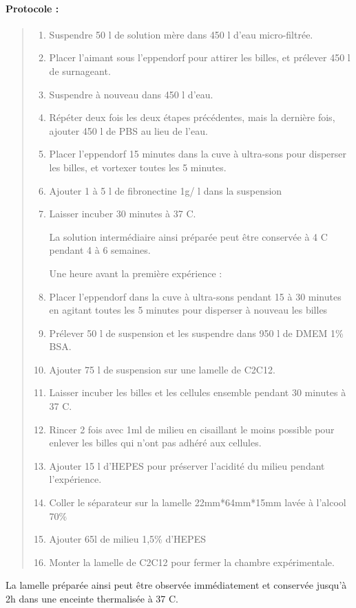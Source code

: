 	\paragraph{Protocole : }
	\begin{quote}
	\begin{enumerate}
	\item Suspendre 50 \micro l de solution mère dans 450  \micro l d'eau micro-filtrée. 
	\item Placer l'aimant sous l'eppendorf pour attirer les billes, et prélever 450 \micro l de surnageant.
	\item Suspendre à nouveau dans 450 \micro l d'eau.
	\item Répéter deux fois les deux étapes précédentes, mais la dernière fois, ajouter 450 \micro l de PBS au lieu de l'eau. 
	\item Placer l'eppendorf 15 minutes dans la cuve à ultra-sons pour disperser les billes, et vortexer toutes les 5 minutes.
	\item Ajouter 1 à 5 \micro l de fibronectine 1\micro g/ \micro l  dans la suspension
	\item Laisser incuber 30 minutes à 37 \degres C. 

La solution intermédiaire ainsi préparée peut être conservée à 4 \degres C pendant 4 à 6 semaines. 

Une heure avant la première expérience : 
	\item Placer l'eppendorf dans la cuve à ultra-sons pendant 15 à 30 minutes en agitant toutes les 5 minutes pour disperser à nouveau les billes
	\item Prélever 50 \micro l de suspension et les suspendre dans 950 \micro l de DMEM 1\% BSA. 
	\item Ajouter 75 \micro l de suspension sur une lamelle de C2C12.
	\item Laisser incuber les billes et les cellules ensemble pendant 30 minutes à 37 \degres C. 
	\item Rincer 2 fois avec 1ml de milieu en cisaillant le moins possible pour enlever les billes qui n'ont pas adhéré aux cellules. 
	\item Ajouter 15 \micro l d'HEPES pour préserver l'acidité du milieu pendant l'expérience.
	\item Coller le séparateur sur la lamelle 22mm*64mm*15mm lavée à l'alcool 70\%
	\item Ajouter 65\micro l de milieu 1,5\% d'HEPES
	\item Monter la lamelle de C2C12 pour fermer la chambre expérimentale.  
 
	\end{enumerate}
	\end{quote}
La lamelle préparée ainsi peut être observée immédiatement et conservée jusqu'à 2h dans une enceinte thermalisée à 37 \degres C. 	 	
	
